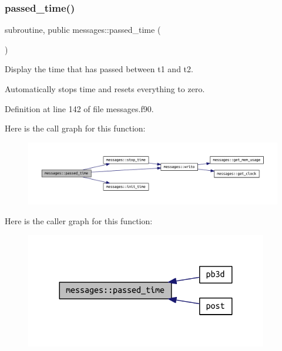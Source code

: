 \subsubsection{\texorpdfstring{passed\+\_\+time()}{passed\_time()}}
{\footnotesize\ttfamily subroutine, public messages\+::passed\+\_\+time (\begin{DoxyParamCaption}{ }\end{DoxyParamCaption})}



Display the time that has passed between {\ttfamily t1} and {\ttfamily t2}. 

Automatically stops time and resets everything to zero. 

Definition at line 142 of file messages.\+f90.

Here is the call graph for this function\+:
\nopagebreak
\begin{figure}[H]
\begin{center}
\leavevmode
\includegraphics[width=350pt]{namespacemessages_a34da9df28502ccd63e62674d51fe8de8_cgraph}
\end{center}
\end{figure}
Here is the caller graph for this function\+:
\nopagebreak
\begin{figure}[H]
\begin{center}
\leavevmode
\includegraphics[width=300pt]{namespacemessages_a34da9df28502ccd63e62674d51fe8de8_icgraph}
\end{center}
\end{figure}
\mbox{\label{namespacemessages_a5686118397930f505259225f3688216b}} 
